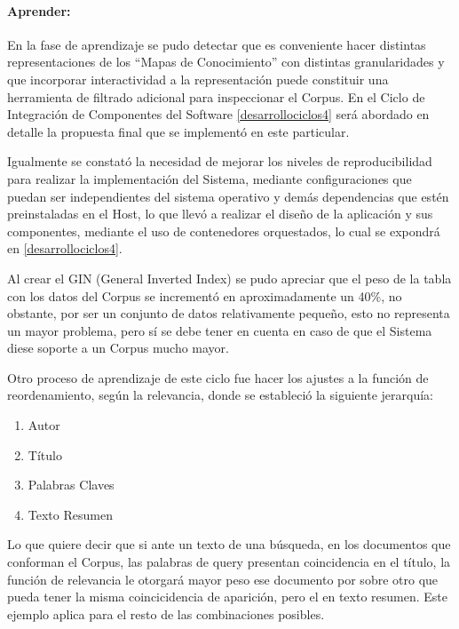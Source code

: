 \documentclass[
  12pt,
  openany]{book}
\begin{document}
\hypertarget{aprender-4}{%
\paragraph{Aprender:}\label{aprender-4}}

En la fase de aprendizaje se pudo detectar que es conveniente hacer distintas representaciones de los ``Mapas de Conocimiento'' con distintas granularidades y que incorporar interactividad a la representación puede constituir una herramienta de filtrado adicional para inspeccionar el Corpus. En el Ciclo de Integración de Componentes del Software \ref{desarrollociclos4} será abordado en detalle la propuesta final que se implementó en este particular.

Igualmente se constató la necesidad de mejorar los niveles de reproducibilidad para realizar la implementación del Sistema, mediante configuraciones que puedan ser independientes del sistema operativo y demás dependencias que estén preinstaladas en el Host, lo que llevó a realizar el diseño de la aplicación y sus componentes, mediante el uso de contenedores orquestados, lo cual se expondrá en \ref{desarrollociclos4}.

Al crear el GIN (General Inverted Index) se pudo apreciar que el peso de la tabla con los datos del Corpus se incrementó en aproximadamente un 40\%, no obstante, por ser un conjunto de datos relativamente pequeño, esto no representa un mayor problema, pero sí se debe tener en cuenta en caso de que el Sistema diese soporte a un Corpus mucho mayor.

Otro proceso de aprendizaje de este ciclo fue hacer los ajustes a la función de reordenamiento, según la relevancia, donde se estableció la siguiente jerarquía:

\begin{enumerate}
\def\labelenumi{\arabic{enumi}.}
\item
  Autor
\item
  Título
\item
  Palabras Claves
\item
  Texto Resumen
\end{enumerate}

Lo que quiere decir que si ante un texto de una búsqueda, en los documentos que conforman el Corpus, las palabras de query presentan coincidencia en el título, la función de relevancia le otorgará mayor peso ese documento por sobre otro que pueda tener la misma coincicidencia de aparición, pero el en texto resumen. Este ejemplo aplica para el resto de las combinaciones posibles.
\end{document}
